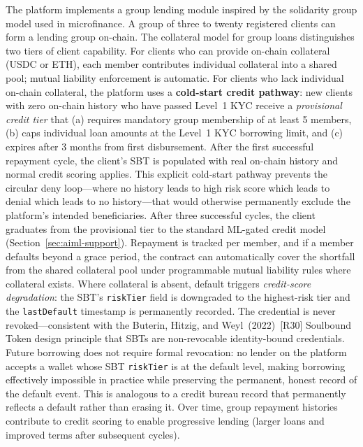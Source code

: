 \documentclass[12pt,a4paper]{report}
\begin{document}
The platform implements a group lending module inspired by the solidarity group model used in microfinance. A group of three to twenty registered clients can form a lending group on-chain. The collateral model for group loans distinguishes two tiers of client capability. For clients who can provide on-chain collateral (USDC or ETH), each member contributes individual collateral into a shared pool; mutual liability enforcement is automatic. For clients who lack individual on-chain collateral, the platform uses a \textbf{cold-start credit pathway}: new clients with zero on-chain history who have passed Level~1 KYC receive a \textit{provisional credit tier} that (a) requires mandatory group membership of at least 5 members, (b) caps individual loan amounts at the Level~1 KYC borrowing limit, and (c) expires after 3 months from first disbursement. After the first successful repayment cycle, the client's SBT is populated with real on-chain history and normal credit scoring applies. This explicit cold-start pathway prevents the circular deny loop---where no history leads to high risk score which leads to denial which leads to no history---that would otherwise permanently exclude the platform's intended beneficiaries. After three successful cycles, the client graduates from the provisional tier to the standard ML-gated credit model (Section~\ref{sec:aiml-support}). Repayment is tracked per member, and if a member defaults beyond a grace period, the contract can automatically cover the shortfall from the shared collateral pool under programmable mutual liability rules where collateral exists. Where collateral is absent, default triggers \textit{credit-score degradation}: the SBT's \texttt{riskTier} field is downgraded to the highest-risk tier and the \texttt{lastDefault} timestamp is permanently recorded. The credential is never revoked---consistent with the Buterin, Hitzig, and Weyl~(2022)~[R30] Soulbound Token design principle that SBTs are non-revocable identity-bound credentials. Future borrowing does not require formal revocation: no lender on the platform accepts a wallet whose SBT \texttt{riskTier} is at the default level, making borrowing effectively impossible in practice while preserving the permanent, honest record of the default event. This is analogous to a credit bureau record that permanently reflects a default rather than erasing it. Over time, group repayment histories contribute to credit scoring to enable progressive lending (larger loans and improved terms after subsequent cycles).
\end{document}
